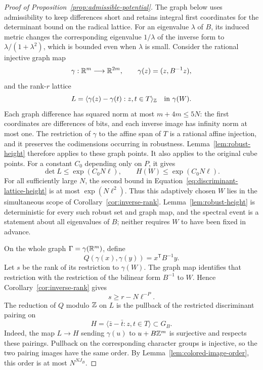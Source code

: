 \begin{proof}[Proof of Proposition~\ref{prop:admissible-potential}]
The graph below uses admissibility to keep differences short and retains
integral first coordinates for the determinant bound on the radical lattice.
For an eigenvalue \(\lambda\) of \(B\), its induced metric changes the
corresponding eigenvalue \(1/\lambda\) of the inverse form to
\(\lambda/(1+\lambda^2)\), which is bounded even when \(\lambda\) is small.
Consider the rational injective graph map
\[
 \gamma:\mathbb R^m\longrightarrow\mathbb R^{2m},\qquad
 \gamma(z)=(z,B^{-1}z),
\]
and the rank-\(r\) lattice
\[
 L=\langle\gamma(z)-\gamma(t):z,t\in T\rangle_{\mathbb Z}
 \quad\text{in }\gamma(W).
\]
Each graph difference has squared norm at most \(m+4m\le5N\):
the first coordinates are differences of bits, and each inverse
image has infinity norm at most one. The restriction of
\(\gamma\) to the affine span of \(T\) is a rational affine
injection, and it preserves the codimensions occurring in
robustness. Lemma~\ref{lem:robust-height} therefore applies to
these graph points. It also applies to the original cube points.
For a constant \(C_0\) depending only on \(P\), it gives
\begin{equation}\label{eq:discriminant-lattice-height}
 \det L\le\exp(C_0N\ell),\qquad
 H(W)\le\exp(C_0N\ell).
\end{equation}
For all sufficiently large \(N\), the second bound in
Equation~\eqref{eq:discriminant-lattice-height} is at most
\(\exp(N\ell^2)\). Thus this adaptively chosen \(W\) lies in the
simultaneous scope of Corollary~\ref{cor:inverse-rank}.
Lemma~\ref{lem:robust-height} is deterministic for every such
robust set and graph map, and the spectral event is a statement
about all eigenvalues of \(B\); neither requires \(W\) to have
been fixed in advance.

On the whole graph \(\Gamma=\gamma(\mathbb R^m)\), define
\[
 Q(\gamma(x),\gamma(y))=x^{\mathsf T}B^{-1}y.
\]
Let \(s\) be the rank of its restriction to \(\gamma(W)\).
The graph map identifies that restriction with the restriction
of the bilinear form \(B^{-1}\) to \(W\). Hence
Corollary~\ref{cor:inverse-rank} gives
\begin{equation}\label{eq:discriminant-rank}
 s\ge r-N\ell^{-P}.
\end{equation}
The reduction of \(Q\) modulo \(\mathbb Z\) on \(L\) is the pullback of
the restricted discriminant pairing on
\[
 H=\langle \bar z-\bar t:z,t\in T\rangle\subset G_B.
\]
Indeed, the map \(L\to H\) sending \(\gamma(u)\) to
\(u+B\mathbb Z^m\) is surjective and respects these pairings. Pullback
on the corresponding character groups is injective, so the two
pairing images have the same order. By
Lemma~\ref{lem:colored-image-order}, this order is at most
\(N^{NJ_B}\).


\end{proof}
